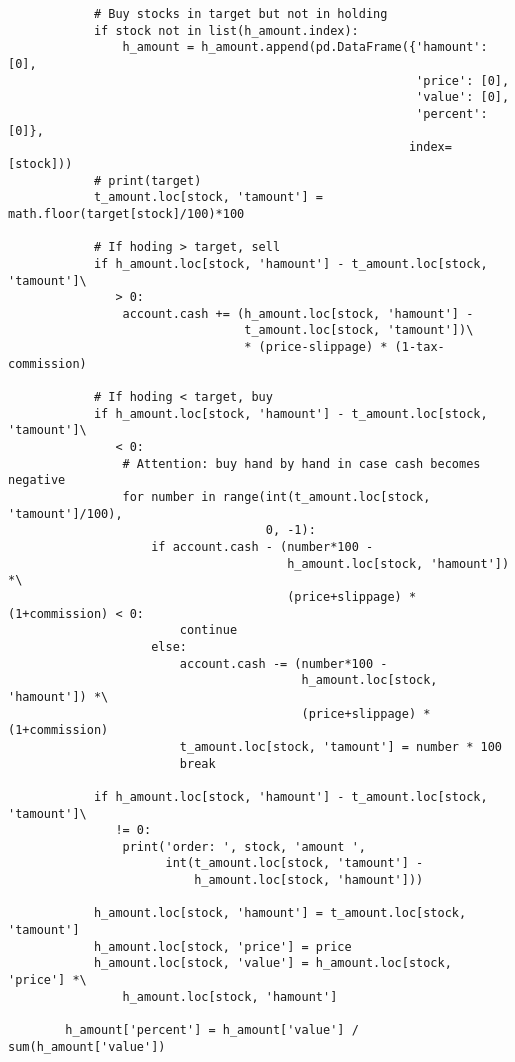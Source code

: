 \documentclass[11pt]{article}
\begin{document}
\begin{lstlisting}
            # Buy stocks in target but not in holding
            if stock not in list(h_amount.index):
                h_amount = h_amount.append(pd.DataFrame({'hamount': [0],
                                                         'price': [0],
                                                         'value': [0],
                                                         'percent': [0]},
                                                        index=[stock]))
            # print(target)
            t_amount.loc[stock, 'tamount'] = math.floor(target[stock]/100)*100

            # If hoding > target, sell
            if h_amount.loc[stock, 'hamount'] - t_amount.loc[stock, 'tamount']\
               > 0:
                account.cash += (h_amount.loc[stock, 'hamount'] -
                                 t_amount.loc[stock, 'tamount'])\
                                 * (price-slippage) * (1-tax-commission)

            # If hoding < target, buy
            if h_amount.loc[stock, 'hamount'] - t_amount.loc[stock, 'tamount']\
               < 0:
                # Attention: buy hand by hand in case cash becomes negative
                for number in range(int(t_amount.loc[stock, 'tamount']/100),
                                    0, -1):
                    if account.cash - (number*100 -
                                       h_amount.loc[stock, 'hamount']) *\
                                       (price+slippage) * (1+commission) < 0:
                        continue
                    else:
                        account.cash -= (number*100 -
                                         h_amount.loc[stock, 'hamount']) *\
                                         (price+slippage) * (1+commission)
                        t_amount.loc[stock, 'tamount'] = number * 100
                        break

            if h_amount.loc[stock, 'hamount'] - t_amount.loc[stock, 'tamount']\
               != 0:
                print('order: ', stock, 'amount ',
                      int(t_amount.loc[stock, 'tamount'] -
                          h_amount.loc[stock, 'hamount']))

            h_amount.loc[stock, 'hamount'] = t_amount.loc[stock, 'tamount']
            h_amount.loc[stock, 'price'] = price
            h_amount.loc[stock, 'value'] = h_amount.loc[stock, 'price'] *\
                h_amount.loc[stock, 'hamount']

        h_amount['percent'] = h_amount['value'] / sum(h_amount['value'])


\end{lstlisting}
\end{document}
